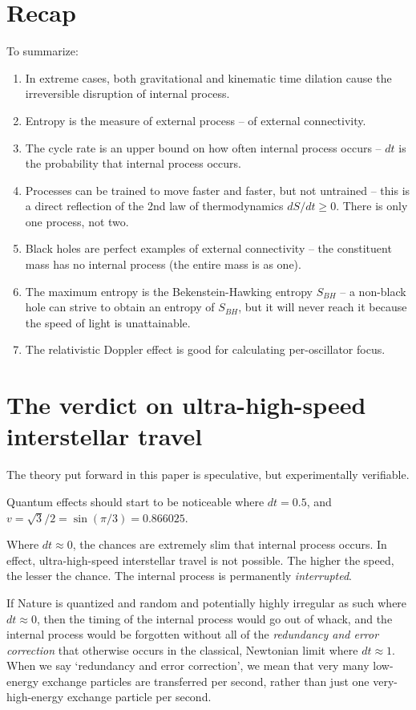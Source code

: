 \documentclass[12pt]{article}
\begin{document}
\section{Recap}

To summarize:
\begin{enumerate}
\item In extreme cases, both gravitational and kinematic time dilation cause the irreversible disruption of internal process.
\item Entropy is the measure of external process -- of external connectivity.
\item The cycle rate is an upper bound on how often internal process occurs -- $dt$ is the probability that internal process occurs.
\item Processes can be trained to move faster and faster, but not untrained -- this is a direct reflection of the 2nd law of thermodynamics $dS/dt \geq 0$. There is only one process, not two.
\item Black holes are perfect examples of external connectivity -- the constituent mass has no internal process (the entire mass is as one).
\item The maximum entropy is the Bekenstein-Hawking entropy $S_{BH}$ -- a non-black hole can strive to obtain an entropy of $S_{BH}$, but it will never reach it because the speed of light is unattainable.
\item The relativistic Doppler effect is good for calculating per-oscillator focus.
\end{enumerate}




\section{The verdict on ultra-high-speed interstellar travel}

The theory put forward in this paper is speculative, but experimentally verifiable.

Quantum effects should start to be noticeable where $dt = 0.5$, and $v = \sqrt{3} / 2 = \sin(\pi/3) = 0.866025$.

Where $dt \approx 0$, the chances are extremely slim that internal process occurs.
In effect, ultra-high-speed interstellar travel is not possible.
The higher the speed, the lesser the chance.
The internal process is permanently \textit{interrupted}.

If Nature is quantized and random and potentially highly irregular as such where $dt \approx 0$, then the timing of the internal process would go out of whack, and the internal process would be forgotten without all of the {\textit{redundancy and error correction}} that otherwise occurs in the classical, Newtonian limit where $dt \approx 1$.
When we say `redundancy and error correction', we mean that very many low-energy exchange particles are transferred per second, rather than just one very-high-energy exchange particle per second.
\end{document}
